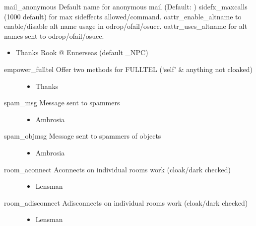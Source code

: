 \documentclass[letterpaper,10pt,english]{sphinxmanual}
\begin{document}
\sphinxAtStartPar
mail\_anonymous \sphinxhyphen{} Default name for anonymous mail (Default: )
sidefx\_maxcalls \sphinxhyphen{} (1000 default) for max sideffects allowed/command.
oattr\_enable\_altname \sphinxhyphen{} to enable/disable alt name usage in odrop/ofail/osucc.
oattr\_uses\_altname \sphinxhyphen{} for alt names sent to odrop/ofail/osucc.
\begin{itemize}
\item {} 
\sphinxAtStartPar
Thanks Rook @ Ennerseas (default \_NPC)

\end{itemize}
\begin{description}
\item[{empower\_fulltel \sphinxhyphen{} Offer two methods for FULLTEL (‘self’ \& anything not cloaked)}] \leavevmode\begin{itemize}
\item {} 
\sphinxAtStartPar
Thanks 

\end{itemize}

\item[{spam\_msg \sphinxhyphen{} Message sent to spammers}] \leavevmode\begin{itemize}
\item {} 
\sphinxAtStartPar
Ambrosia

\end{itemize}

\item[{spam\_objmsg \sphinxhyphen{} Message sent to spammers of objects}] \leavevmode\begin{itemize}
\item {} 
\sphinxAtStartPar
Ambrosia

\end{itemize}

\item[{room\_aconnect \sphinxhyphen{} Aconnects on individual rooms work (cloak/dark checked)}] \leavevmode\begin{itemize}
\item {} 
\sphinxAtStartPar
Lensman

\end{itemize}

\item[{room\_adisconnect \sphinxhyphen{} Adisconnects on individual rooms work (cloak/dark checked)}] \leavevmode\begin{itemize}
\item {} 
\sphinxAtStartPar
Lensman

\end{itemize}

\end{description}
\end{document}
